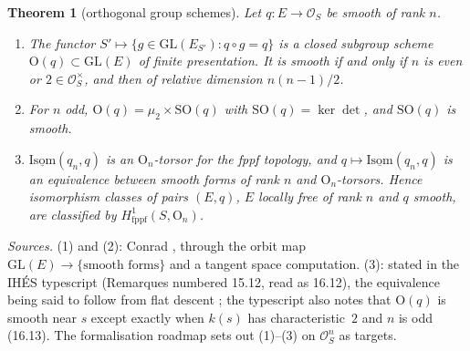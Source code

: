 \documentclass[11pt,a4paper]{amsart}
\newcommand{\cO}{\mathcal{O}}
\newcommand{\GL}{\mathrm{GL}}
\newcommand{\Ort}{\mathrm{O}}
\newcommand{\SO}{\mathrm{SO}}
\newcommand{\Isom}{\operatorname{\underline{Isom}}}
\theoremstyle{plain}
\newtheorem{theorem}{Theorem}[section]
\theoremstyle{definition}
\begin{document}
\begin{theorem}[orthogonal group schemes]\label{thm:orth}
Let $q\colon E\to\cO_S$ be smooth of rank $n$.
\begin{enumerate}
\item The functor $S'\mapsto\{g\in\GL(E_{S'}) : q\circ g=q\}$ is a closed subgroup scheme $\Ort(q)\subset\GL(E)$ of finite presentation. It is smooth if and only if $n$ is even or $2\in\cO_S^\times$, and then of relative dimension $n(n-1)/2$.
\item For $n$ odd, $\Ort(q)=\mu_2\times\SO(q)$ with $\SO(q)=\ker\det$, and $\SO(q)$ is smooth.
\item $\Isom(q_n,q)$ is an $\Ort_n$-torsor for the fppf topology, and $q\mapsto\Isom(q_n,q)$ is an equivalence between smooth forms of rank $n$ and $\Ort_n$-torsors. Hence isomorphism classes of pairs $(E,q)$, $E$ locally free of rank $n$ and $q$ smooth, are classified by $H^1_{\mathrm{fppf}}(S,\Ort_n)$.
\end{enumerate}
\end{theorem}

\noindent\emph{Sources.} (1) and (2): Conrad \cite[Thm.~C.1.5]{conrad}, through the orbit map $\GL(E)\to\{\text{smooth forms}\}$ and a tangent space computation. (3): stated in the IHÉS typescript (Remarques numbered 15.12, read as 16.12), the equivalence being said to follow from flat descent \cite{ihes}; the typescript also notes that $\Ort(q)$ is smooth near $s$ except exactly when $k(s)$ has characteristic~$2$ and $n$ is odd (16.13). The formalisation roadmap \cite{roadmap} sets out (1)--(3) on $\cO_S^n$ as targets.
\end{document}
